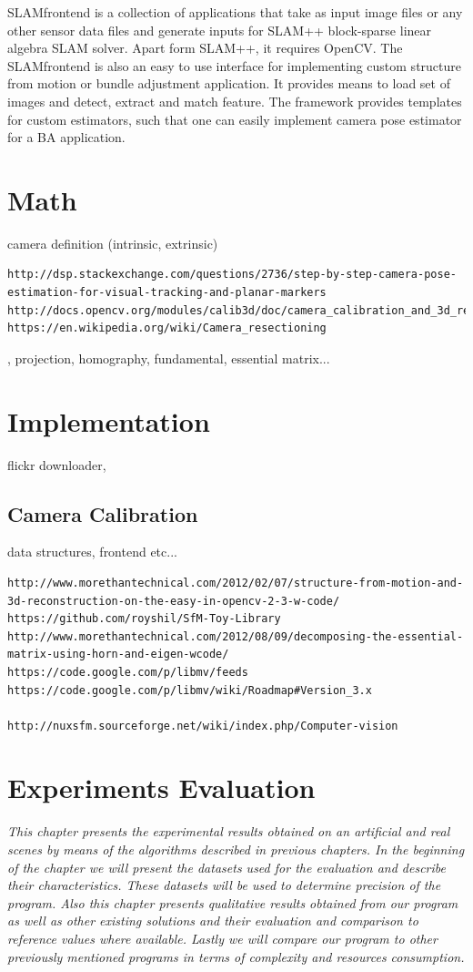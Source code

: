 SLAM\textunderscore frontend \cite{www:slam_frontend} is a collection of applications that take as input image files or any other sensor data files and generate inputs for SLAM++ block-sparse linear algebra SLAM solver. Apart form SLAM++, it requires OpenCV. The SLAM\textunderscore frontend is also an easy to use interface for implementing custom structure from motion or bundle adjustment application. It provides means to load set of images and detect, extract and match feature. The framework provides templates for custom estimators, such that one can easily implement camera pose estimator for a BA application.

\chapter{Math}
camera definition (intrinsic, extrinsic)
\begin{verbatim}
http://dsp.stackexchange.com/questions/2736/step-by-step-camera-pose-estimation-for-visual-tracking-and-planar-markers
http://docs.opencv.org/modules/calib3d/doc/camera_calibration_and_3d_reconstruction.html#solvepnpransac
https://en.wikipedia.org/wiki/Camera_resectioning
\end{verbatim}
, projection, homography, fundamental, essential matrix...

\chapter{Implementation}
flickr downloader, 
\section{Camera Calibration}
\label{sec:camera_calib} 
data structures, frontend etc...
\begin{verbatim}
http://www.morethantechnical.com/2012/02/07/structure-from-motion-and-3d-reconstruction-on-the-easy-in-opencv-2-3-w-code/
https://github.com/royshil/SfM-Toy-Library
http://www.morethantechnical.com/2012/08/09/decomposing-the-essential-matrix-using-horn-and-eigen-wcode/
https://code.google.com/p/libmv/feeds
https://code.google.com/p/libmv/wiki/Roadmap#Version_3.x

http://nuxsfm.sourceforge.net/wiki/index.php/Computer-vision
\end{verbatim}

\chapter{Experiments Evaluation}
\textit{This chapter presents the experimental results obtained on an artificial and real scenes by means of the algorithms described in previous chapters. In the beginning of the chapter we will present the datasets used for the evaluation and describe their characteristics. These datasets will be used to determine precision of the program. Also this chapter presents qualitative results obtained from our program as well as other existing solutions and their evaluation and comparison to reference values where available. Lastly we will compare our program to other previously mentioned programs in terms of complexity and resources consumption. }
